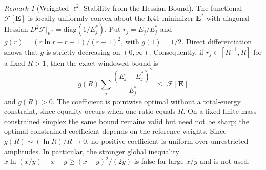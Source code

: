 \documentclass[12pt,a4paper]{article}
\theoremstyle{definition}
\theoremstyle{plain}
\theoremstyle{remark}
\newtheorem{remark}[definition]{Remark}
\begin{document}
\begin{remark}[Weighted $\ell^2$-Stability from the Hessian Bound]
\label{rem:talagrand}
The functional $\mathcal{F}[\mathbf{E}]$ is locally uniformly convex about
the K41 minimizer $\mathbf{E}^*$ with diagonal Hessian
$D^2\mathcal{F}|_{\mathbf{E}^*} = \mathrm{diag}(1/E_j^*)$.  Put
$r_j=E_j/E_j^*$ and
$g(r)=(r\ln r-r+1)/(r-1)^2$, with $g(1)=1/2$.  Direct differentiation
shows that $g$ is strictly decreasing on $(0,\infty)$.  Consequently, if
$r_j\in[R^{-1},R]$ for a fixed $R>1$, then the exact windowed bound is
\[
  g(R)\sum_j \frac{(E_j - E_j^*)^2}{E_j^*}
  \;\le\; \mathcal{F}[\mathbf{E}]
\]
and $g(R)>0$.  The coefficient is pointwise optimal without a total-energy
constraint, since equality occurs when one ratio equals $R$.  On a fixed
finite mass-constrained simplex the same bound remains valid but need not
be sharp; the optimal constrained coefficient depends on the reference
weights.  Since $g(R)\sim(\ln R)/R\to0$, no positive coefficient is
uniform over unrestricted amplitudes.  In particular, the stronger
global inequality
$x\ln(x/y)-x+y\ge (x-y)^2/(2y)$ is false for large $x/y$ and is not used.
\end{remark}
\end{document}
